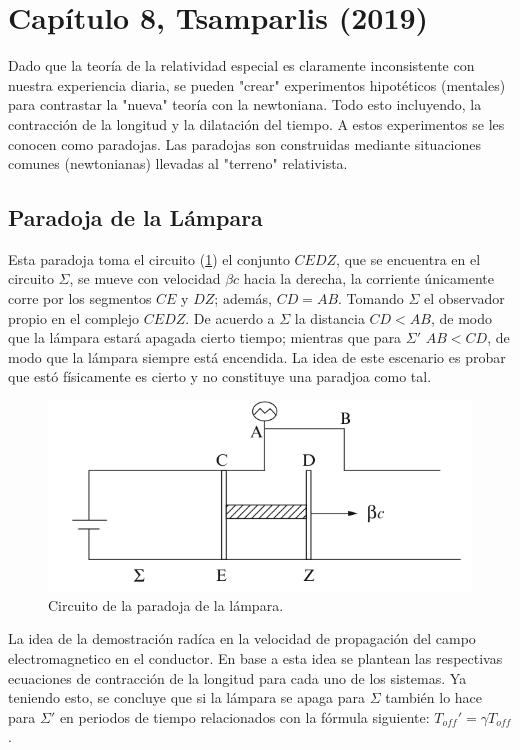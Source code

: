 \section{Capítulo 8, Tsamparlis (2019)}

Dado que la teoría de la relatividad especial es claramente inconsistente con nuestra experiencia diaria, se pueden "crear" experimentos hipotéticos (mentales) para contrastar la "nueva" teoría con la newtoniana. Todo esto incluyendo, la contracción de la longitud y la dilatación del tiempo. A estos experimentos se les conocen como paradojas. Las paradojas son construidas mediante situaciones comunes (newtonianas) llevadas al "terreno" relativista.

\subsection{Paradoja de la Lámpara}
Esta paradoja toma el circuito (\ref{lamp}) el conjunto $CEDZ$, que se encuentra en el circuito $\Sigma$, se mueve con velocidad $\beta c$ hacia la derecha, la corriente únicamente corre por los segmentos $CE$ y $DZ$; además, $CD = AB$. Tomando $\Sigma$ el observador propio en el complejo $CEDZ$. De acuerdo a $\Sigma$ la distancia $CD < AB$, de modo que la lámpara estará apagada cierto tiempo; mientras que para $\Sigma '$ $AB < CD$, de modo que la lámpara siempre está encendida. La idea de este escenario es probar que estó físicamente es cierto y no constituye una paradjoa como tal. 

\begin{figure}[H]
	\centering
	\includegraphics[scale=0.5]{img/lamp.png}
	\caption{Circuito de la paradoja de la lámpara.}
	\label{lamp}
\end{figure}

La idea de la demostración radíca en la velocidad de propagación del campo electromagnetico en el conductor. En base a esta idea se plantean las respectivas ecuaciones de contracción de la longitud para cada uno de los sistemas. Ya teniendo esto, se concluye que si la lámpara se apaga para $\Sigma$ también lo hace para $\Sigma '$ en periodos de tiempo relacionados con la fórmula siguiente: $T_{off} ' = \gamma T_{off}$.

